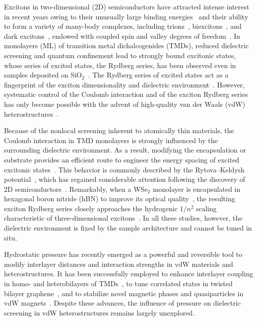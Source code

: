 \documentclass[twocolumn,showpacs,preprintnumbers,prl,fleqn,superscriptaddress]{revtex4-2}
\begin{document}
Excitons in two-dimensional (2D) semiconductors have attracted intense interest in recent years owing to their unusually large binding energies~\cite{Ugeda2014} and their ability to form a variety of many-body complexes, including trions~\cite{Mak2012}, biexcitons~\cite{You2015}, and dark excitons~\cite{molas2017}, endowed with coupled spin and valley degrees of freedom~\cite{Xu2014}. In monolayers (ML) of transition metal dichalcogenides (TMDs), reduced dielectric screening and quantum confinement lead to strongly bound excitonic states, whose series of excited states, the Rydberg series, has been observed even in samples deposited on SiO$_2$~\cite{chernikov2014,he2014}. The Rydberg series of excited states act as a fingerprint of the exciton dimensionality and dielectric environment~\cite{Yu2010}. However, systematic control of the Coulomb interaction and of the exciton Rydberg series has only become possible with the advent of high-quality van der Waals (vdW) heterostructures~\cite{Geim2013}.

Because of the nonlocal screening inherent to atomically thin materials, the Coulomb interaction in TMD monolayers is strongly influenced by the surrounding dielectric environment. As a result, modifying the encapsulation or substrate provides an efficient route to engineer the energy spacing of excited excitonic states~\cite{stier2016,Raja2017}. This behavior is commonly described by the Rytova–Keldysh potential~\cite{rytova1967,Keldysh1979}, which has regained considerable attention following the discovery of 2D semiconductors~\cite{Qiu2013,Wang2018,Dery2018,stier2018,Molas2019}. Remarkably, when a WSe$_2$ monolayer is encapsulated in hexagonal boron nitride (hBN) to improve its optical quality~\cite{Cadiz2017}, the resulting exciton Rydberg series closely approaches the hydrogenic $1/n^2$ scaling characteristic of three-dimensional excitons~\cite{stier2018,Molas2019}. In all these studies, however, the dielectric environment is fixed by the sample architecture and cannot be tuned in situ.

Hydrostatic pressure has recently emerged as a powerful and reversible tool to modify interlayer distances and interaction strengths in vdW materials and heterostructures. It has been successfully employed to enhance interlayer coupling in homo- and heterobilayers of TMDs~\cite{Hsu2022,Xia2020,Zhu2022}, to tune correlated states in twisted bilayer graphene~\cite{Yankowitz2019}, and to stabilize novel magnetic phases and quasiparticles in vdW magnets~\cite{Pawbake2023,Pawbake2022}. Despite these advances, the influence of pressure on dielectric screening in vdW heterostructures remains largely unexplored.
\end{document}
